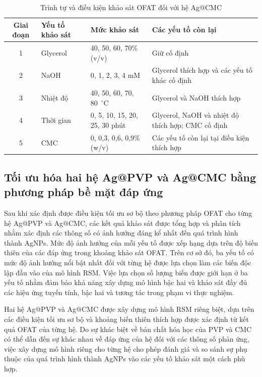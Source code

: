 \begin{table}[htbp]
\centering
\caption{Trình tự và điều kiện khảo sát OFAT đối với hệ Ag@CMC}
\label{tab:ofat-ag-cmc}
\begin{tabular}{@{}clp{5.0cm}p{5.0cm}@{}}
\toprule
Giai đoạn & Yếu tố khảo sát & Mức khảo sát & Các yếu tố còn lại \\
\midrule
1 & Glycerol & 40, 50, 60, 70\% (v/v) & Giữ cố định \\
2 & NaOH & 0, 1, 2, 3, 4 mM & Glycerol thích hợp và các yếu tố khác cố định \\
3 & Nhiệt độ & 40, 50, 60, 70, 80~$^\circ$C & Glycerol và NaOH thích hợp \\
4 & Thời gian & 0, 5, 10, 15, 20, 25, 30 phút & Glycerol, NaOH và nhiệt độ thích hợp; CMC cố định \\
5 & CMC & 0, 0,3, 0,6, 0,9\% (w/v) & Các yếu tố còn lại tại điều kiện thích hợp \\
\bottomrule
\end{tabular}
\end{table}

\subsection{Tối ưu hóa hai hệ Ag@PVP và Ag@CMC bằng phương pháp bề mặt đáp ứng}
Sau khi xác định được điều kiện tối ưu sơ bộ theo phương pháp OFAT cho từng hệ Ag@PVP và Ag@CMC, các kết quả khảo sát được tổng hợp và phân tích nhằm xác định các thông số có ảnh hưởng đáng kể nhất đến quá trình hình thành AgNPs.
Mức độ ảnh hưởng của mỗi yếu tố được xếp hạng dựa trên độ biến thiên của các đáp ứng trong khoảng khảo sát OFAT.
Trên cơ sở đó, ba yếu tố có mức độ ảnh hưởng nổi bật nhất đối với từng hệ được lựa chọn làm các biến độc lập đầu vào của mô hình RSM.
Việc lựa chọn số lượng biến được giới hạn ở ba yếu tố nhằm đảm bảo khả năng xây dựng mô hình bậc hai và khảo sát đầy đủ các hiệu ứng tuyến tính, bậc hai và tương tác trong phạm vi thực nghiệm.
\par
Hai hệ Ag@PVP và Ag@CMC được xây dựng mô hình RSM riêng biệt, dựa trên các điều kiện tối ưu sơ bộ và khoảng biến thiên thích hợp được xác định từ kết quả OFAT của từng hệ.
Do sự khác biệt về bản chất hóa học của PVP và CMC có thể dẫn đến sự khác nhau về đáp ứng của hệ đối với các thông số phản ứng, việc xây dựng mô hình riêng cho từng hệ cho phép đánh giá và so sánh sự phụ thuộc của quá trình hình thành AgNPs vào các yếu tố khảo sát một cách phù hợp.

